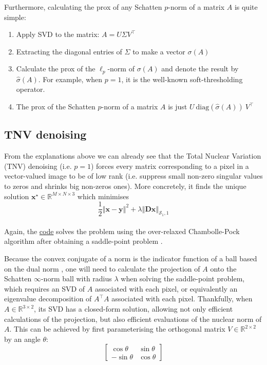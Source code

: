 \documentclass{article}
\begin{document}
Furthermore, calculating the prox of any Schatten \(p\)-norm of a matrix \(A\) is quite simple:
\begin{enumerate}
    \item Apply SVD to the matrix: \(A = U \Sigma V^\top\)
    \item Extracting the diagonal entries of \(\Sigma\) to make a vector \(\sigma\left(A\right)\)
    \item Calculate the prox of the \(\ell_p\)-norm of \(\sigma\left(A\right)\) and denote the result by \(\hat{\sigma}\left(A\right)\). For example, when \(p=1\), it is the well-known soft-thresholding operator.
    \item The prox of the Schatten \(p\)-norm of a matrix \(A\) is just \(U \  \text{diag}\left(\hat{\sigma}\left(A\right)\right) \  V^\top\)
\end{enumerate}

\subsection*{TNV denoising} \label{sec:tnv_denoising}
From the explanations above we can already see that the Total Nuclear Variation (TNV) denoising (i.e. \(p=1\)) forces every matrix corresponding to a pixel in a vector-valued image to be of low rank (i.e. suppress small non-zero singular values to zeros and shrinks big non-zeros ones). More concretely, it finds the unique solution \(\mathbf{x}^\star \in \mathbb{R}^{M \times N \times 3}\) which minimises\\
%
\[\frac{1}{2} \left\Vert \mathbf{x}-\mathbf{y} \right\Vert ^2 + \lambda \left\Vert \mathbf{D}\mathbf{x} \right\Vert_{\mathcal{S}_1,1}\]\\
%
Again, the \href{https://github.com/tedyiningding/Image-Denoising/blob/main/TNVdenoise.m}{code} solves the problem using the over-relaxed Chambolle-Pock algorithm \cite[Algorithm 3.1]{condat2013primal} after obtaining a saddle-point problem \cite[Sec. 7.3.]{chambolle2016introduction}.

Because the convex conjugate of a norm is the indicator function of a ball based on the dual norm \cite[Sec. 6.5]{parikh2014proximal}, one will need to calculate the projection of \(A\) onto the Schatten \(\infty\)-norm ball with radius \(\lambda\) when solving the saddle-point problem, which requires an SVD of \(A\) associated with each pixel, or equivalently an eigenvalue decomposition of \(A^{\top}A\) associated with each pixel. Thankfully, when \(A \in \mathbb{R}^{3 \times 2}\), its SVD has a closed-form solution, allowing not only efficient calculations of the projection, but also efficient evaluations of the nuclear norm of \(A\). This can be achieved by first parameterising the orthogonal matrix \(V \in \mathbb{R}^{2 \times 2}\) by an angle \(\theta\):\\
%
\[\begin{bmatrix}
\cos \theta & \sin \theta\\
-\sin \theta & \cos \theta
\end{bmatrix}\]
\end{document}
